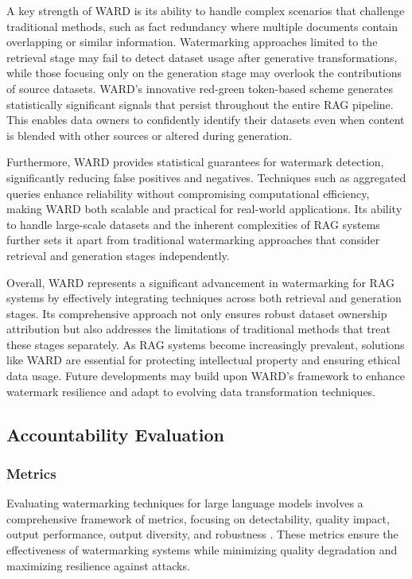 A key strength of WARD is its ability to handle complex scenarios that challenge traditional methods, such as fact redundancy where multiple documents contain overlapping or similar information. Watermarking approaches limited to the retrieval stage may fail to detect dataset usage after generative transformations, while those focusing only on the generation stage may overlook the contributions of source datasets. WARD's innovative red-green token-based scheme generates statistically significant signals that persist throughout the entire RAG pipeline. This enables data owners to confidently identify their datasets even when content is blended with other sources or altered during generation.

Furthermore, WARD provides statistical guarantees for watermark detection, significantly reducing false positives and negatives. Techniques such as aggregated queries enhance reliability without compromising computational efficiency, making WARD both scalable and practical for real-world applications. Its ability to handle large-scale datasets and the inherent complexities of RAG systems further sets it apart from traditional watermarking approaches that consider retrieval and generation stages independently.

Overall, WARD represents a significant advancement in watermarking for RAG systems by effectively integrating techniques across both retrieval and generation stages. Its comprehensive approach not only ensures robust dataset ownership attribution but also addresses the limitations of traditional methods that treat these stages separately. As RAG systems become increasingly prevalent, solutions like WARD are essential for protecting intellectual property and ensuring ethical data usage. Future developments may build upon WARD's framework to enhance watermark resilience and adapt to evolving data transformation techniques.


\subsection{Accountability Evaluation}
\subsubsection{Metrics}

Evaluating watermarking techniques for large language models involves a comprehensive framework of metrics, focusing on detectability, quality impact, output performance, output diversity, and robustness \cite{liu2024survey}. These metrics ensure the effectiveness of watermarking systems while minimizing quality degradation and maximizing resilience against attacks.

